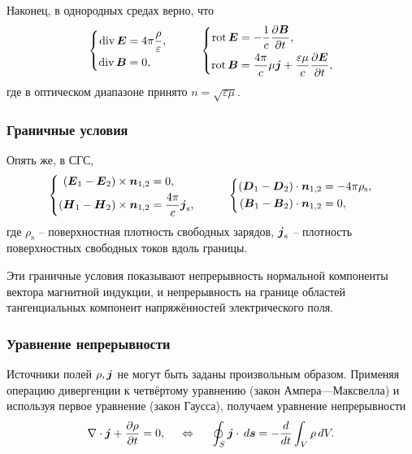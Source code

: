 Наконец, в однородных средах верно, что
\begin{equation*}
    \left\{\begin{aligned}
        \mathop{\mathrm{div}}\nolimits \mbox{\boldmath $E$} &= 4\pi \frac{\rho}{\varepsilon},  \\
        \mathop{\mathrm{div}}\nolimits \mbox{\boldmath $B$} &= 0,
    \end{aligned}\right.
    \hspace{1cm} 
    \left\{\begin{aligned}
        \mathop{\mathrm{rot}}\nolimits \mbox{\boldmath $E$} &= - \frac{1}{c} \frac{\partial \mbox{\boldmath $B$}}{\partial t}, \\
        \mathop{\mathrm{rot}}\nolimits \mbox{\boldmath $B$} &= \frac{4\pi}{c} \mu \mbox{\boldmath $j$} + \frac{\varepsilon \mu}{c} \frac{\partial \mbox{\boldmath $E$}}{\partial t},
    \end{aligned}\right.
\end{equation*}
где в оптическом диапазоне принято $n = \sqrt{\varepsilon \mu}$.

\subsubsection*{Граничные условия}
Опять же, в СГС,
\begin{equation*}
    \left\{\begin{aligned}
        (\mbox{\boldmath $E$}_1 - \mbox{\boldmath $E$}_2) \times \mbox{\boldmath $n$}_{1,2} &= 0, \\
        (\mbox{\boldmath $H$}_1 - \mbox{\boldmath $H$}_2) \times \mbox{\boldmath $n$}_{1,2} &= \frac{4\pi}{c} \mbox{\boldmath $j$}_\text{s},
    \end{aligned}\right.
    \hspace{1cm} 
    \left\{\begin{aligned}
        \left(\mbox{\boldmath $D$}_1 - \mbox{\boldmath $D$}_2\right) \cdot \mbox{\boldmath $n$}_{1,2} &= - 4\pi \rho_\text{s}, \\
        \left(\mbox{\boldmath $B$}_1 - \mbox{\boldmath $B$}_2\right) \cdot \mbox{\boldmath $n$}_{1, 2} &= 0,
    \end{aligned}\right.
\end{equation*}
где $\rho_{\text{s}}$ -- поверхностная плотность свободных зарядов, $\mbox{\boldmath $j$}_\text{s}$ -- плотность поверхностных свободных токов вдоль границы. 

Эти граничные условия показывают непрерывность нормальной компоненты вектора магнитной индукции, и непрерывность на границе областей тангенциальных компонент напряжённостей электрического поля. 

\subsubsection*{Уравнение непрерывности}

Источники полей $\rho, \mbox{\boldmath $j$}$ не могут быть заданы произвольным образом. Применяя операцию дивергенции к четвёртому уравнению (закон Ампера—Максвелла) и используя первое уравнение (закон Гаусса), получаем уравнение непрерывности
\begin{equation*}
    \nabla \cdot \mbox{\boldmath $j$} + \frac{\partial \rho}{\partial t} = 0,
    \hspace{0.5cm} \Leftrightarrow \hspace{0.5cm} 
    \oint_S \mbox{\boldmath $j$} \cdot \, d \mbox{\boldmath $s$} = - \frac{d }{d t} \int_V \rho \, d V.
\end{equation*}


